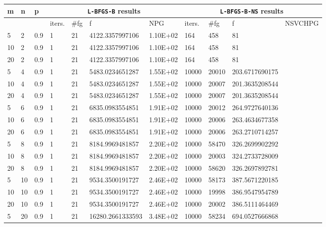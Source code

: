 \begin{table}
  \tiny
  \begin{center}
    \begin{tabular}{|l|l|l|l|l|l|l|l|l|l|l|}
      \hline
      m  & n & p  & \multicolumn{4}{|c|}{\texttt{L-BFGS-B} results} & \multicolumn{4}{|c|}{\texttt{L-BFGS-B-NS} results} \\ \hline
  &    &  & iters. & \#fg & f & NPG & iters. & \#fg & f & NSVCHPG \\ \hline
      5 & 2 & 0.9 & 1 & 21 & 4122.3357997106 & 1.10E+02 & 164 & 458 & 81 & \\
      10 & 2 & 0.9 & 1 & 21 & 4122.3357997106 & 1.10E+02 & 164 & 458 & 81 & \\
      20 & 2 & 0.9 & 1 & 21 & 4122.3357997106 & 1.10E+02 & 164 & 458 & 81 & \\
      5 & 4 & 0.9 & 1 & 21 & 5483.0234651287 & 1.55E+02 & 10000 & 20010 & 203.6717690175 & \\
      10 & 4 & 0.9 & 1 & 21 & 5483.0234651287 & 1.55E+02 & 10000 & 20007 & 201.3635208544 & \\
      20 & 4 & 0.9 & 1 & 21 & 5483.0234651287 & 1.55E+02 & 10000 & 20007 & 201.3635208544 & \\
      5 & 6 & 0.9 & 1 & 21 & 6835.0983554851 & 1.91E+02 & 10000 & 20012 & 264.9727640136 & \\
      10 & 6 & 0.9 & 1 & 21 & 6835.0983554851 & 1.91E+02 & 10000 & 20006 & 263.4634677358 & \\
      20 & 6 & 0.9 & 1 & 21 & 6835.0983554851 & 1.91E+02 & 10000 & 20006 & 263.2710714257 & \\
      5 & 8 & 0.9 & 1 & 21 & 8184.9969481857 & 2.20E+02 & 10000 & 58470 & 326.2699902292 & \\
      10 & 8 & 0.9 & 1 & 21 & 8184.9969481857 & 2.20E+02 & 10000 & 20003 & 324.2733728009 & \\
      20 & 8 & 0.9 & 1 & 21 & 8184.9969481857 & 2.20E+02 & 10000 & 58620 & 326.2697892781 & \\
      5 & 10 & 0.9 & 1 & 21 & 9534.3500191727 & 2.46E+02 & 10000 & 58173 & 387.5671220185 & \\
      10 & 10 & 0.9 & 1 & 21 & 9534.3500191727 & 2.46E+02 & 10000 & 19998 & 386.9547954789 & \\
      20 & 10 & 0.9 & 1 & 21 & 9534.3500191727 & 2.46E+02 & 10000 & 20002 & 386.5111464469 & \\
      5 & 20 & 0.9 & 1 & 21 & 16280.2661333593 & 3.48E+02 & 10000 & 58234 & 694.0527666868 & \\

\end{tabular}
\end{center}
\end{table}
